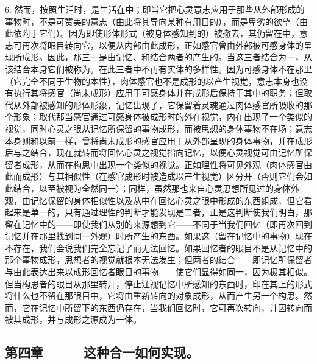 6. 然而，按照生活时，是生活在中；即当它把心灵意志应用于那些从外部形成的事物时，不是可赞美的意志（由此将其导向某种有用目的），而是卑劣的欲望（由此依附于它们）。因为即使形体形式（被身体感知到的）被撤去，其仍留在中，意志可再次将眼目转向它，以便从内部由此成形，正如感官曾由外部被可感身体的呈现所成形。因此，那三一是由记忆、和结合两者的产生的。当这三者结合为一，从该结合本身它们被称为。在此三者中不再有实体的多样性。因为可感身体不在那里（它完全不同于生物的本性），肉体感官也不是成形的以产生视觉，意志本身也没有执行其将感官（尚未成形）应用于可感身体并在成形后保持于其中的职务；但取代从外部被感知的形体形象，记忆出现了，它保留着灵魂通过肉体感官所吸收的那个形象；取代那当感官通过可感身体被成形时的外在视觉，内在出现了一个类似的视觉，同时心灵之眼从记忆所保留的事物成形，而被思想的身体事物不在场；意志本身则和以前一样，曾将尚未成形的感官应用于从外部呈现的身体事物，并在成形后与之结合，现在就转而将回忆心灵之视觉指向记忆，以便心灵视觉可由记忆所保留者成形，从而在构思中出现一个类似的视觉。正如理性将可见外观（肉体感官由此而成形）与其相似性（在感官成形时被造成以产生视觉）区分开（否则它们会如此结合，以至被视为全然同一）；同样，虽然那也来自心灵思想所见过的身体外观，由记忆保留的身体相似性以及从中在回忆心灵之眼中形成的东西组成，但它看起来是单一的，只有通过理性的判断才能发现是二者，正是这判断使我们明白，那留在记忆中的——即使我们从别的来源想到它——不同于当我们回忆（即再次回到记忆并在那里找到同一外观）时所产生的东西。如果这（留在记忆中的事物）现在不存在，我们会说我们完全忘记了而无法回忆。如果回忆者的眼目不是从记忆中的那个事物成形，思想者的视觉就根本无法发生；但两者的结合——即记忆所保留者与由此表达出来以成形回忆者眼目的事物——使它们显得如同一，因为极其相似。但当构思者的眼目从那里转开，停止注视记忆中所感知的东西时，印在其上的形式将什么也不留在那眼目中，它将由重新转向的对象成形，从而产生另一个构思。然而，它在记忆中所留下的东西仍存在，当我们回忆时，它可再次转向，并因转向而被其成形，并与成形之源成为一体。\par


\subsection{第四章　—　这种合一如何实现。}

